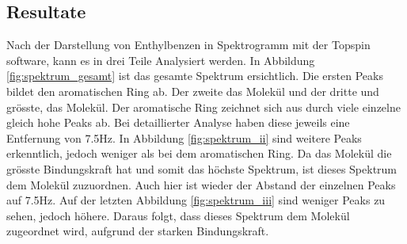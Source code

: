 \documentclass[a4paper]{article}
\newenvironment{Figure}
	{\par\medskip\noindent\minipage{\linewidth}}
	{\endminipage\par\medskip}
\begin{document}
\begin{multicols*}{2}
			\begin{Figure}
				\centering
				\label{fig:molekul}
				\vspace*{0.5mm}
			\end{Figure}
		
			\subsection{Resultate}
				Nach der Darstellung von Enthylbenzen in Spektrogramm mit der Topspin software, 
				kann es in drei Teile Analysiert werden. In Abbildung \ref{fig:spektrum_gesamt} ist das gesamte Spektrum
				ersichtlich. Die ersten Peaks bildet den aromatischen Ring ab. Der zweite das 
				Molekül und der dritte und grösste, das  Molekül. Der aromatische Ring zeichnet
				sich aus durch viele einzelne gleich hohe Peaks ab. Bei detaillierter Analyse haben
				diese jeweils eine Entfernung von 7.5Hz. In Abbildung \ref{fig:spektrum_ii} sind weitere Peaks
				erkenntlich, jedoch weniger als bei dem aromatischen Ring. Da das  Molekül die
				grösste Bindungskraft hat und somit das höchste Spektrum, ist dieses Spektrum dem
				 Molekül zuzuordnen. Auch hier ist wieder der Abstand der einzelnen Peaks auf
				7.5Hz. Auf der letzten Abbildung \ref{fig:spektrum_iii} sind weniger Peaks zu sehen, jedoch höhere. Daraus
				folgt, dass dieses Spektrum dem  Molekül zugeordnet wird, aufgrund der starken
				Bindungskraft.
			

\end{multicols*}
\end{document}

